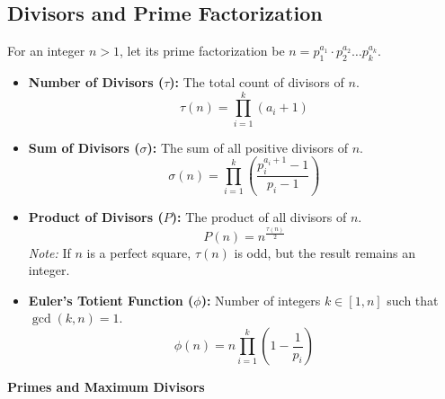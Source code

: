 \subsection{Divisors and Prime Factorization}

For an integer $n > 1$, let its prime factorization be $n = p_1^{a_1} \cdot p_2^{a_2} \dots p_k^{a_k}$.

\begin{itemize}
    \item \textbf{Number of Divisors ($\tau$):} 
    The total count of divisors of $n$.
    \[ \tau(n) = \prod_{i=1}^{k} (a_i + 1) \]

    \item \textbf{Sum of Divisors ($\sigma$):} 
    The sum of all positive divisors of $n$.
    \[ \sigma(n) = \prod_{i=1}^{k} \left( \frac{p_i^{a_i+1} - 1}{p_i - 1} \right) \]

    \item \textbf{Product of Divisors ($P$):} 
    The product of all divisors of $n$.
    \[ P(n) = n^{\frac{\tau(n)}{2}} \]
    \textit{Note:} If $n$ is a perfect square, $\tau(n)$ is odd, but the result remains an integer.

    \item \textbf{Euler's Totient Function ($\phi$):} 
    Number of integers $k \in [1, n]$ such that $\gcd(k, n) = 1$.
    \[ \phi(n) = n \prod_{i=1}^{k} \left( 1 - \frac{1}{p_i} \right) \]
\end{itemize}

\vspace{0.5em}
\noindent\textbf{Primes and Maximum Divisors}

